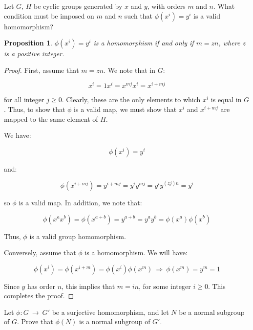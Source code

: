 \documentclass[10pt, oneside]{article}
\newenvironment{problem}[2][Problem]{\begin{trivlist}
\item[\hskip \labelsep {\bfseries #1}\hskip \labelsep {\bfseries #2.}]}{\end{trivlist}}
\newtheorem{prop}{Proposition}
\begin{document}
    \begin{problem}{4.11}
      Let $G$, $H$ be cyclic groups generated by $x$ and $y$, with orders $m$ and $n$. What condition must be imposed on $m$ and $n$ such that $\phi(x^{i}) = y^i$ is a
      valid homomorphism?
    \end{problem}

    \begin{prop}
      $\phi(x^i) = y^i$ is a homomorphism if and only if $m = zn$, where $z$ is a positive integer.
    \end{prop}

    \begin{proof}
      First, assume that $m = zn$. We note that in $G$:

      $$x^{i} = 1 x^{i} = x^{mj} x^{i} = x^{i + mj}$$

      for all integer $j \geq 0$. Clearly, these are the only elements to which $x^i$ is equal in $G$. Thus, to show that $\phi$ is a valid
      map, we must show that $x^{i}$ and $x^{i + mj}$ are mapped to the same element of $H$.
      \newline

      We have:

      $$\phi(x^i) = y^i$$

      and:

      $$\phi(x^{i + mj}) = y^{i + mj} = y^i y^{mj} = y^i y^{(zj)n} = y^i$$

      so $\phi$ is a valid map. In addition, we note that:

      $$\phi(x^{a} x^{b}) = \phi(x^{a + b}) = y^{a + b} = y^a y^b = \phi(x^a) \phi(x^b)$$

      Thus, $\phi$ is a valid group homomorphism.
      \newline

      Conversely, assume that $\phi$ is a homomorphism. We will have:

      $$\phi(x^{i}) = \phi(x^{i + m}) = \phi(x^i) \phi(x^m) \ \Rightarrow \ \phi(x^m) = y^m = 1$$

      Since $y$ has order $n$, this implies that $m = in$, for some integer $i \geq 0$. This completes the proof.
    \end{proof}

    \begin{problem}{4.23}
      Let $\phi : G \ \rightarrow \ G'$ be a surjective homomorphism, and let $N$ be a normal subgroup of $G$. Prove that $\phi(N)$ is a normal subgroup of $G'$.
    \end{problem}
\end{document}
